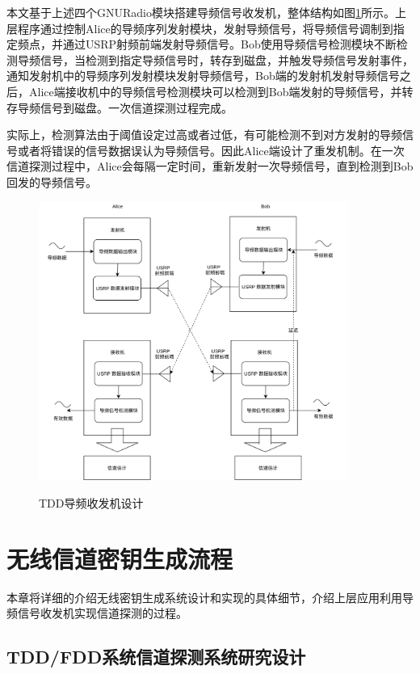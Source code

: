 \documentclass[master]{seuthesis} %
\begin{document}
\begin{Main}
本文基于上述四个GNURadio模块搭建导频信号收发机，整体结构如图\ref{two_tranceiver_structure2}所示。上层程序通过控制Alice的导频序列发射模块，发射导频信号，将导频信号调制到指定频点，并通过USRP射频前端发射导频信号。Bob使用导频信号检测模块不断检测导频信号，当检测到指定导频信号时，转存到磁盘，并触发导频信号发射事件，通知发射机中的导频序列发射模块发射导频信号，Bob端的发射机发射导频信号之后，Alice端接收机中的导频信号检测模块可以检测到Bob端发射的导频信号，并转存导频信号到磁盘。一次信道探测过程完成。

实际上，检测算法由于阈值设定过高或者过低，有可能检测不到对方发射的导频信号或者将错误的信号数据误认为导频信号。因此Alice端设计了重发机制。在一次信道探测过程中，Alice会每隔一定时间，重新发射一次导频信号，直到检测到Bob回发的导频信号。

\begin{figure}
    \centering
    \includegraphics[width=0.9\textwidth]{images/two_tranceiver_structure2}
    \caption{TDD导频收发机设计}{} 
    \label{two_tranceiver_structure2}
\end{figure}

\chapter{无线信道密钥生成流程}

本章将详细的介绍无线密钥生成系统设计和实现的具体细节，介绍上层应用利用导频信号收发机实现信道探测的过程。%

\section{TDD/FDD系统信道探测系统研究设计}


\end{Main}
\end{document}
